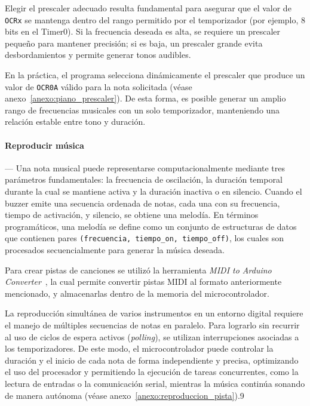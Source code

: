    \vspace{1em}

    Elegir el prescaler adecuado resulta fundamental para asegurar que el valor de \texttt{OCRx} se mantenga dentro del rango permitido por el temporizador (por ejemplo, 8 bits en el Timer0). Si la frecuencia deseada es alta, se requiere un prescaler pequeño para mantener precisión; si es baja, un prescaler grande evita desbordamientos y permite generar tonos audibles. 

    \vspace{1em}

    En la práctica, el programa selecciona dinámicamente el prescaler que produce un valor de \texttt{OCR0A} válido para la nota solicitada (véase anexo~\ref{anexo:piano_prescaler}). De esta forma, es posible generar un amplio rango de frecuencias musicales con un solo temporizador, manteniendo una relación estable entre tono y duración.

    \vspace{1em}

    \paragraph*{\textbf{Reproducir música}}---
    Una nota musical puede representarse computacionalmente mediante tres parámetros fundamentales: la frecuencia de oscilación, la duración temporal durante la cual se mantiene activa y la duración inactiva o en silencio. Cuando el buzzer emite una secuencia ordenada de notas, cada una con su frecuencia, tiempo de activación, y silencio, se obtiene una melodía. En términos programáticos, una melodía se define como un conjunto de estructuras de datos que contienen pares \texttt{(frecuencia, tiempo\_on, tiempo\_off)}, los cuales son procesados secuencialmente para generar la música deseada.
    
    Para crear pistas de canciones se utilizó la herramienta \textit{MIDI to Arduino Converter}~\cite{arduino_midi_converter}, la cual permite convertir pistas MIDI al formato anteriormente mencionado, y almacenarlas dentro de la memoria del microcontrolador.

    \vspace{1em}

    La reproducción simultánea de varios instrumentos en un entorno digital requiere el manejo de múltiples secuencias de notas en paralelo. Para lograrlo sin recurrir al uso de ciclos de espera activos (\textit{polling}), se utilizan interrupciones asociadas a los temporizadores. De este modo, el microcontrolador puede controlar la duración y el inicio de cada nota de forma independiente y precisa, optimizando el uso del procesador y permitiendo la ejecución de tareas concurrentes, como la lectura de entradas o la comunicación serial, mientras la música continúa sonando de manera autónoma (véase anexo~\ref{anexo:reproduccion_pista}).9

